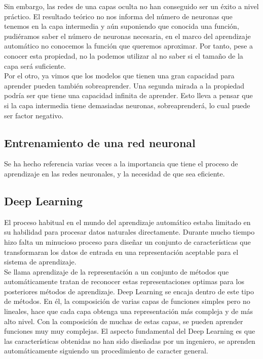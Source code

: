 Sin embargo, las redes de una capas oculta no han conseguido ser un éxito a nivel práctico. El resultado teórico no nos informa del número de neuronas que tenemos en la capa intermedia y aún suponiendo que conocida una función, pudiéramos saber el número de neuronas necesaria, en el marco del aprendizaje automático no conocemos la función que queremos aproximar. Por tanto, pese a conocer esta propiedad, no la podemos utilizar al no saber si el tamaño de la capa será suficiente.\\

Por el otro, ya vimos que los modelos que tienen una gran capacidad para aprender pueden también sobreaprender. Una segunda mirada a la propiedad podría ser que tiene una capacidad infinita de aprender. Esto lleva a pensar que si la capa intermedia tiene demasiadas neuronas, sobreaprenderá, lo cual puede ser factor negativo.\\


\subsection{Entrenamiento de una red neuronal}

Se ha hecho referencia varias veces a la importancia que tiene el proceso de aprendizaje en las redes neuronales, y la necesidad de que sea eficiente.

\subsection{Deep Learning}

El proceso habitual en el mundo del aprendizaje automático estaba limitado en su habilidad para procesar datos naturales directamente. Durante mucho tiempo hizo falta un minucioso proceso para diseñar un conjunto de características que transformaran los datos de entrada en una representación aceptable para el sistema de aprendizaje.\\

Se llama aprendizaje de la representación a un conjunto de métodos que automáticamente tratan de reconocer estas representaciones optimas para los posteriores métodos de aprendizaje. Deep Learning se encaja dentro de este tipo de métodos. En él, la composición de varias capas de funciones simples pero no lineales, hace que cada capa obtenga una representación más compleja y de más alto nivel. Con la composición de muchas de estas capas, se pueden aprender funciones muy muy complejas. El aspecto fundamental del Deep Learning es que las características obtenidas no han sido diseñadas por un ingeniero, se aprenden automáticamente siguiendo un procedimiento de caracter general.\\
 
